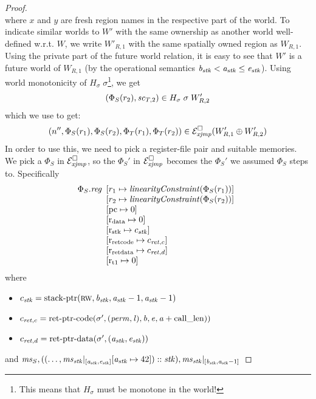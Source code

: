 \documentclass[a4paper]{article}
\begin{document}
\begin{proof}
\[\]
where $x$ and $y$ are fresh region names in the respective part of the world. To indicate similar worlds to $W'$ with the same ownership as another world well-defined w.r.t. $W$, we write $W'_{R,1}$ with the same spatially owned region as $W_{R,1}$. Using the private part of the future world relation, it is easy to see that $W'$ is a future world of $W_{R,1}$ (by the operational semantics $\baddr_\stk < \aaddr_\stk \leq \eaddr_\stk$). Using world monotonicity of $H_\sigma \; \sigma$\footnote{{\color{red}This means that $H_\sigma$ must be monotone in the world!}}, we get
\[
  (\Phi_S(r_2), \vsc_{T,2}) \in H_\sigma \; \sigma \; W'_{R,2}
\]
which we use to get:
\[
  \npair[n'']{\Phi_S(r_1),\Phi_S(r_2),\Phi_T(r_1),\Phi_T(r_2)} \in \lrexj(W_{R,1}' \oplus W_{R,2}')
\]
In order to use this, we need to pick a register-file pair and suitable memories. We pick a $\Phi_S$ in $\lrexj$, so the $\Phi_S'$ in $\lrexj$ becomes the $\Phi_S'$ we assumed $\Phi_S$ steps to. Specifically
\[
  \Phi_S.\reg
  \begin{array}[t]{l}
    \update{r_1}{\linCons{\Phi_S(r_1)}}\\
    \update{r_2}{\linCons{\Phi_S(r_2)}}\\
    \update{\pcreg}{0} \\
    \update{\rdata}{0} \\
    \update{\rstk}{c_\stk}\\
    \update{\rretc}{c_{\ret,c}}\\
    \update{\rretd}{c_{\ret,d}}\\
    \update{\rtmp{1}}{0}\\
  \end{array}
\]
where
\begin{itemize}
\item $c_\stk = \stkptr{\rw,\baddr_\stk,\aaddr_\stk-1,\aaddr_\stk-1}$
\item $c_{\ret,c} = \retptrc(\sigma',(\perm,\lin),\baddr,\eaddr,\aaddr+\calllen))$
\item $c_{\ret,d} = \retptrd(\sigma',(\aaddr_\stk,\eaddr_\stk))$
\end{itemize}
and
$\ms_S,((\dots,\ms_\stk|_{[\aaddr_\stk,\eaddr_\stk]}\update{\aaddr_\stk}{42}) :: \stk),\ms_\stk|_{[\baddr_\stk,\aaddr_\stk-1]}$


\end{proof}
\end{document}
